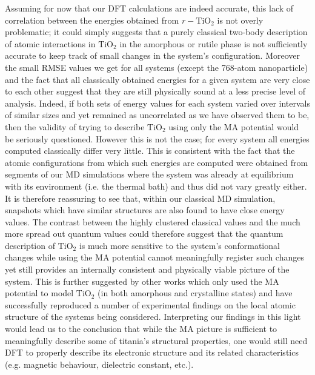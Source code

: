 \documentclass[aps,prb,twocolumn,amsmath,amssymb,superscriptaddress,longbibliography]{revtex4-1}
\newcommand\tab[1][1cm]{\hspace*{#1}} %
\begin{document}
\tab Assuming for now that our DFT calculations are indeed accurate, this lack of correlation between the energies obtained from $r-\text{TiO}_2$ is not overly problematic; it could simply suggests that a purely classical two-body description of atomic interactions in $\text{TiO}_2$ in the amorphous or rutile phase is not sufficiently accurate to keep track of small changes in the system's configuration.
Moreover the small RMSE values we get for all systems (except the 768-atom nanoparticle) and the fact that all classically obtained energies for a given system are very close to each other suggest that they are still physically sound at a less precise level of analysis.
Indeed, if both sets of energy values for each system varied over intervals of similar sizes and yet remained as uncorrelated as we have observed them to be, then the validity of trying to describe $\text{TiO}_2$ using only the MA potential would be seriously questioned.
However this is not the case; for every system all energies computed classically differ very little.
This is consistent with the fact that the atomic configurations from which such energies are computed were obtained from segments of our MD simulations where the system was already at equilibrium with its environment (i.e. the thermal bath) and thus did not vary greatly either.
It is therefore reassuring to see that, within our classical MD simulation, snapshots which have similar structures are also found to have close energy values. 
The contrast between the highly clustered classical values and the much more spread out quantum values could therefore suggest that the quantum description of $\text{TiO}_2$ is much more sensitive to the system's conformational changes while using the MA potential cannot meaningfully register such changes yet still provides an internally consistent and physically viable picture of the system.
This is further suggested by other works which only used the MA potential to model $\text{TiO}_2$ (in both amorphous and crystalline states) and have successfully reproduced a number of experimental findings on the local atomic structure of the systems being considered\cite{vvh1,vvh2,fichtorn}.
Interpreting our findings in this light would lead us to the conclusion that while the MA picture is sufficient to meaningfully describe some of titania's structural properties, one would still need DFT to properly describe its electronic structure and its related characteristics (e.g. magnetic behaviour, dielectric constant, etc.). 
\end{document}
